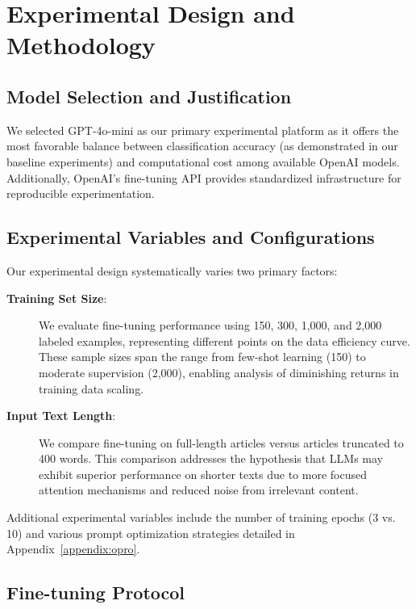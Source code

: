 \section{Experimental Design and Methodology}
\label{sec:llm-methodology}

\subsection{Model Selection and Justification}

We selected GPT-4o-mini as our primary experimental platform as it offers the most favorable balance between classification accuracy (as demonstrated in our baseline experiments) and computational cost among available OpenAI models. Additionally, OpenAI's fine-tuning API provides standardized infrastructure for reproducible experimentation.

\subsection{Experimental Variables and Configurations}

Our experimental design systematically varies two primary factors:

\begin{description}
    \item[\textbf{Training Set Size}:] We evaluate fine-tuning performance using 150, 300, 1,000, and 2,000 labeled examples, representing different points on the data efficiency curve. These sample sizes span the range from few-shot learning (150) to moderate supervision (2,000), enabling analysis of diminishing returns in training data scaling.

    \item[\textbf{Input Text Length}:] We compare fine-tuning on full-length articles versus articles truncated to 400 words. This comparison addresses the hypothesis that LLMs may exhibit superior performance on shorter texts due to more focused attention mechanisms and reduced noise from irrelevant content.
\end{description}

Additional experimental variables include the number of training epochs (3 vs. 10) and various prompt optimization strategies detailed in Appendix~\ref{appendix:opro}.

\subsection{Fine-tuning Protocol}

